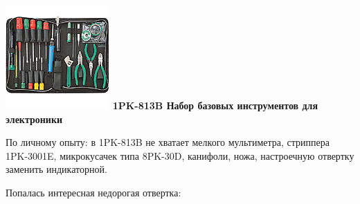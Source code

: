 {\begin{multicols}{2}
\columnbreak

\noindent\includegraphics[width=\columnwidth]{00/fig/pros/1PK-813B.jpg}
\textbf{1PK-813B Набор базовых инструментов для электроники}
\end{multicols}

По личному опыту: в 1PK-813B не хватает мелкого мультиметра, стриппера
1PK-3001E, микрокусачек типа 8PK-30D, канифоли, ножа, настроечную отвертку
заменить индикаторной.


Попалась интересная недорогая отвертка:

}
